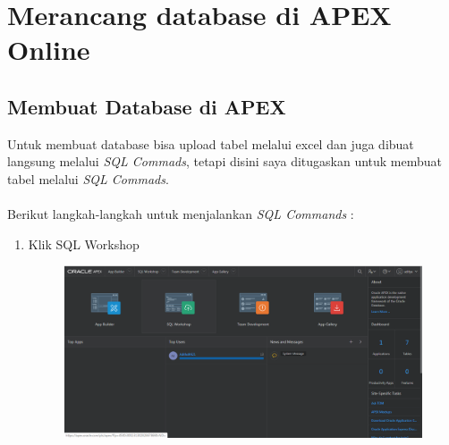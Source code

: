 \documentclass[12pt, times new roman, a4paper]{report}
\begin{document}
\section{Merancang database di APEX Online}
\subsection{Membuat Database di APEX}
\hspace{1cm} Untuk membuat database bisa upload tabel melalui excel dan juga dibuat langsung melalui \textit{SQL Commads}, tetapi disini saya ditugaskan untuk membuat tabel melalui \textit{SQL Commads}.\\
\\
Berikut langkah-langkah untuk menjalankan \textit{SQL Commands} :

\begin{enumerate}

\item Klik SQL Workshop
\begin{figure} [h]
	\centering
		\includegraphics[scale=0.25]{gambar/1}
\end{figure}


\end{enumerate}
\end{document}
